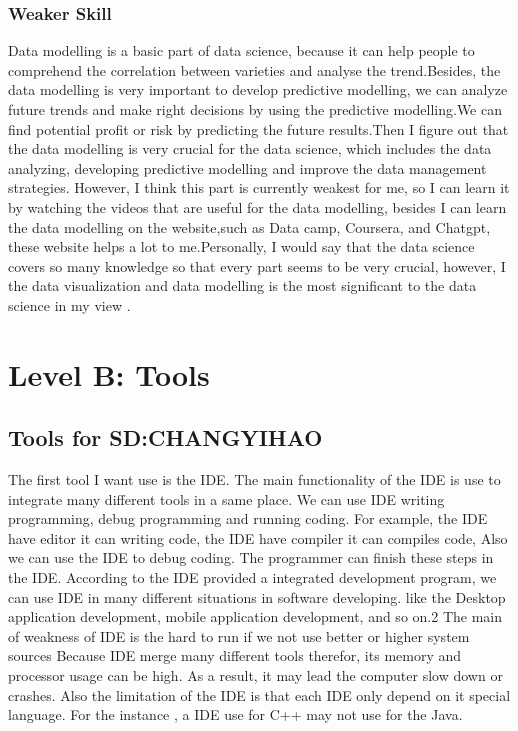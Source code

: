 \documentclass[a4paper, 11pt]{report}
\begin{document}
\subsubsection{Weaker Skill}
	Data modelling is a basic part of data science, because it can help people to comprehend the correlation between varieties and analyse the trend.Besides, the data modelling is very important to develop predictive modelling, we can analyze future trends and make right decisions by using the predictive modelling.We can find potential profit or risk by predicting the future results.Then I figure out that the data modelling is very crucial for the data science, which includes the data analyzing, developing predictive modelling and improve the data management strategies. However, I think this part is currently weakest for me, so I can learn it by watching the videos that are useful for the data modelling, besides I can learn the data modelling on the website,such as Data camp, Coursera, and Chatgpt, these website helps a lot to me.Personally, I would say that the data science covers so many knowledge so that every part seems to be very crucial, however, I the data visualization and data modelling is the most significant to the data science in my view .

\newpage
\section{Level B: Tools}
\subsection{Tools for SD:CHANGYIHAO}
The first tool I want use is the IDE. The main functionality of the IDE is use to integrate many different tools in a same place. We can use IDE writing programming, debug programming and running coding. For example, the IDE have editor it can writing code, the IDE have compiler it can compiles code, Also we can use the IDE to debug coding. The programmer can finish these steps in the IDE. 
According to the IDE provided a integrated development program, we can use IDE in many different situations in software developing. like the Desktop application development, mobile application development, and so on.2
The main of weakness of IDE is the hard to run if we not use better or higher system sources \cite{IDE1}
Because IDE merge many different tools therefor, its memory and processor usage can be high. As a result, it may lead the computer slow down or crashes. Also the limitation of the IDE is that each IDE only depend on it special language. For the instance , a IDE use for C++  may not use for the Java. \cite{IDE2}
\end{document}

